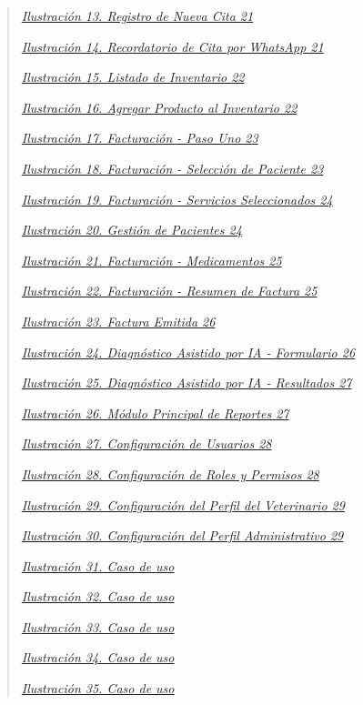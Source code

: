 \documentclass[
]{article}
\begin{document}
\begin{quote}
\hyperref[_bookmark36]{\emph{Ilustración 13. Registro de Nueva Cita 21}}

\hyperref[_bookmark37]{\emph{Ilustración 14. Recordatorio de Cita por WhatsApp 21}}

\hyperref[_bookmark38]{\emph{Ilustración 15. Listado de Inventario 22}}

\hyperref[_bookmark39]{\emph{Ilustración 16. Agregar Producto al Inventario 22}}

\hyperref[_bookmark40]{\emph{Ilustración 17. Facturación - Paso Uno 23}}

\hyperref[_bookmark41]{\emph{Ilustración 18. Facturación - Selección de Paciente 23}}

\hyperref[_bookmark42]{\emph{Ilustración 19. Facturación - Servicios Seleccionados 24}}

\hyperref[_bookmark43]{\emph{Ilustración 20. Gestión de Pacientes 24}}

\hyperref[_bookmark44]{\emph{Ilustración 21. Facturación - Medicamentos 25}}

\hyperref[_bookmark45]{\emph{Ilustración 22. Facturación - Resumen de Factura 25}}

\hyperref[_bookmark46]{\emph{Ilustración 23. Factura Emitida 26}}

\hyperref[_bookmark47]{\emph{Ilustración 24. Diagnóstico Asistido por IA - Formulario 26}}

\hyperref[_bookmark48]{\emph{Ilustración 25. Diagnóstico Asistido por IA - Resultados 27}}

\hyperref[_bookmark49]{\emph{Ilustración 26. Módulo Principal de Reportes 27}}

\hyperref[_bookmark50]{\emph{Ilustración 27. Configuración de Usuarios 28}}

\hyperref[_bookmark51]{\emph{Ilustración 28. Configuración de Roles y Permisos 28}}

\hyperref[_bookmark52]{\emph{Ilustración 29. Configuración del Perfil del Veterinario 29}}

\hyperref[_bookmark53]{\emph{Ilustración 30. Configuración del Perfil Administrativo 29}}

\hyperref[fig31]{\emph{Ilustración 31. Caso de uso}}

\hyperref[fig32]{\emph{Ilustración 32. Caso de uso}}

\hyperref[fig33]{\emph{Ilustración 33. Caso de uso}}

\hyperref[fig34]{\emph{Ilustración 34. Caso de uso}}

\hyperref[fig35]{\emph{Ilustración 35. Caso de uso}}


\end{quote}
\end{document}
